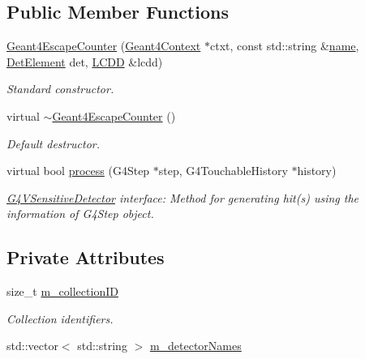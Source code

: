 \subsection*{Public Member Functions}
\begin{DoxyCompactItemize}
\item 
\hyperlink{class_d_d4hep_1_1_simulation_1_1_geant4_escape_counter_a47072d02040a53cfa77a4f893f5aeaa9}{Geant4\+Escape\+Counter} (\hyperlink{class_d_d4hep_1_1_simulation_1_1_geant4_context}{Geant4\+Context} $\ast$ctxt, const std\+::string \&\hyperlink{class_d_d4hep_1_1_simulation_1_1_geant4_action_af374e70b014d16afb81dd9d77cc3894b}{name}, \hyperlink{class_d_d4hep_1_1_simulation_1_1_geant4_sensitive_a1cb1af5fb1194be1e1c1137f1e54272b}{Det\+Element} det, \hyperlink{class_d_d4hep_1_1_simulation_1_1_geant4_sensitive_a3373caa6917867ca7c871df20fb467c8}{L\+C\+DD} \&lcdd)
\begin{DoxyCompactList}\small\item\em Standard constructor. \end{DoxyCompactList}\item 
virtual \hyperlink{class_d_d4hep_1_1_simulation_1_1_geant4_escape_counter_a5bfa77ab4c12efbfc6e311dcf0cc2d6f}{$\sim$\+Geant4\+Escape\+Counter} ()
\begin{DoxyCompactList}\small\item\em Default destructor. \end{DoxyCompactList}\item 
virtual bool \hyperlink{class_d_d4hep_1_1_simulation_1_1_geant4_escape_counter_a869bbe150025b9798af6ab7487d225de}{process} (G4\+Step $\ast$step, G4\+Touchable\+History $\ast$history)
\begin{DoxyCompactList}\small\item\em \hyperlink{class_g4_v_sensitive_detector}{G4\+V\+Sensitive\+Detector} interface\+: Method for generating hit(s) using the information of G4\+Step object. \end{DoxyCompactList}\end{DoxyCompactItemize}
\subsection*{Private Attributes}
\begin{DoxyCompactItemize}
\item 
size\+\_\+t \hyperlink{class_d_d4hep_1_1_simulation_1_1_geant4_escape_counter_a4705f9b7bb31e8f42d05186889ec9729}{m\+\_\+collection\+ID}
\begin{DoxyCompactList}\small\item\em Collection identifiers. \end{DoxyCompactList}\item 
std\+::vector$<$ std\+::string $>$ \hyperlink{class_d_d4hep_1_1_simulation_1_1_geant4_escape_counter_a64b874d036145e35f7ee6d77cfe11209}{m\+\_\+detector\+Names}
\end{DoxyCompactItemize}
